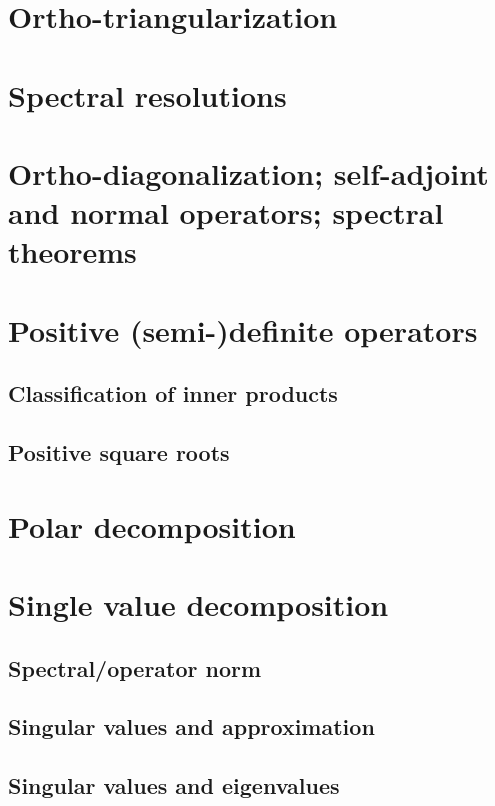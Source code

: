 \documentclass{article}
\theoremstyle{definition}
\begin{document}
\section{Ortho-triangularization}
\newpage 

\section{Spectral resolutions}
\newpage 

\section{Ortho-diagonalization; self-adjoint and normal operators; spectral theorems}
\newpage 

\section{Positive (semi-)definite operators}
\subsection{Classification of inner products}
\subsection{Positive square roots}
\newpage 

\section{Polar decomposition}
\newpage 

\section{Single value decomposition}
\subsection{Spectral/operator norm}
\subsection{Singular values and approximation}
\subsection{Singular values and eigenvalues}
\end{document}
